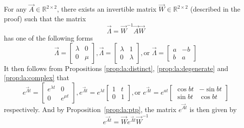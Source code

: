 \begin{corollary} %
	\label{cor:la:linear}
	For any $\vec A \in \mathbb R^{2 \times 2}$, there exists an invertible matrix $\vec W \in \mathbb R^{2 \times 2}$ (described in the proof) such that the matrix
	\begin{equation*}
		\vec \Lambda = \vec W^{-1} \vec A \vec W
	\end{equation*}
	has one of the following forms
	\begin{equation*}
		\vec \Lambda =
			\begin{bmatrix}
				\lambda & 0 \\
				0 		& \mu
			\end{bmatrix},
		\vec \Lambda = 
			\begin{bmatrix}
				\lambda & 1 \\
				0 		& \lambda
			\end{bmatrix}, \text{or }
		\vec \Lambda = 
			\begin{bmatrix}
				a 	& -b \\
				b 	& a
			\end{bmatrix}
	\end{equation*}
	It then follows from Propositions \ref{prop:la:distinct}, \ref{prop:la:degenerate} and \ref{prop:la:complex} that
	\begin{equation*}
		e^{\vec \Lambda t} =
			\begin{bmatrix}
				e^{\lambda t}	& 0 \\
				0 				& e^{\mu t}
			\end{bmatrix},
		e^{\vec \Lambda t} = 
			e^{\lambda t}
			\begin{bmatrix}
				1 	& t \\
				0 	& 1
			\end{bmatrix}, \text{or }
		e^{\vec \Lambda t} =
			e^{at}
			\begin{bmatrix}
				\cos{bt}	& -\sin{bt} \\
				\sin{bt}	& \cos{bt}
			\end{bmatrix}
	\end{equation*}
	respectively. And by Proposition~\ref{prop:la:ptp}, the matrix $e^{\vec At}$ is then given by
	\begin{equation*}
		e^{\vec At} = \vec W e^{\vec \Lambda t} \vec W^{-1}
	\end{equation*}
\end{corollary}

